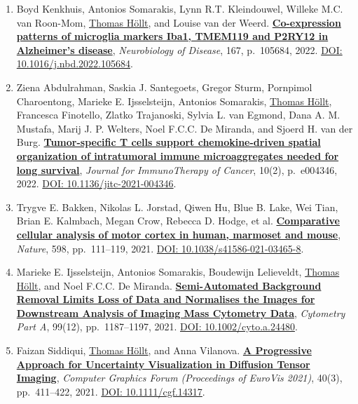\documentclass[10pt,a4paper,roman,final]{moderncv}
\newcommand*\highlightauthor[1]{\underline{#1}}
\begin{document}
\begin{enumerate}[leftmargin=0cm,start=2]
\item
Boyd Kenkhuis, Antonios Somarakis, Lynn R.T. Kleindouwel, Willeke M.C. van Roon-Mom, \highlightauthor{Thomas Höllt}, and Louise van der Weerd.
\href{https://www.thomashollt.com/publications/2022_neurobiology_of_disease/}{\textbf{Co-expression patterns of microglia markers Iba1, TMEM119 and P2RY12 in Alzheimer's disease}},
\emph{Neurobiology of Disease}, 167, p.~105684,
2022.
\href{https://doi.org/10.1016/j.nbd.2022.105684}{DOI: 10.1016/\allowbreak j.nbd.2022.105684}.


\item
Ziena Abdulrahman, Saskia J. Santegoets, Gregor Sturm, Pornpimol Charoentong, Marieke E. Ijsselsteijn, Antonios Somarakis, \highlightauthor{Thomas Höllt}, Francesca Finotello, Zlatko Trajanoski, Sylvia L. van Egmond, Dana A. M. Mustafa, Marij J. P. Welters, Noel F.C.C. De Miranda, and Sjoerd H. van der Burg.
\href{https://www.thomashollt.com/publications/2022_immuno_therapy_cancer/}{\textbf{Tumor-specific T cells support chemokine-driven spatial organization of intratumoral immune microaggregates needed for long survival}},
\emph{Journal for ImmunoTherapy of Cancer}, 10(2), p.~e004346,
2022.
\href{https://doi.org/10.1136/jitc-2021-004346}{DOI: 10.1136/\allowbreak jitc-2021-004346}.


\item
Trygve E. Bakken, Nikolas L. Jorstad, Qiwen Hu, Blue B. Lake, Wei Tian, Brian E. Kalmbach, Megan Crow, Rebecca D. Hodge, et al.
\href{https://www.thomashollt.com/publications/2021_nature/}{\textbf{Comparative cellular analysis of motor cortex in human, marmoset and mouse}},
\emph{Nature}, 598, pp.~111--119,
2021.
\href{https://doi.org/10.1038/s41586-021-03465-8}{DOI: 10.1038/\allowbreak s41586-021-03465-8}.


\item
Marieke E. Ijsselsteijn, Antonios Somarakis, Boudewijn Lelieveldt, \highlightauthor{Thomas Höllt}, and Noel F.C.C. De Miranda.
\href{https://www.thomashollt.com/publications/2020_background_removal/}{\textbf{Semi-Automated Background Removal Limits Loss of Data and Normalises the Images for Downstream Analysis of Imaging Mass Cytometry Data}},
\emph{Cytometry Part A}, 99(12), pp.~1187--1197,
2021.
\href{https://doi.org/10.1002/cyto.a.24480}{DOI: 10.1002/\allowbreak cyto.a.24480}.


\item
Faizan Siddiqui, \highlightauthor{Thomas Höllt}, and Anna Vilanova.
\href{https://www.thomashollt.com/publications/2021_eurovis/}{\textbf{A Progressive Approach for Uncertainty Visualization in Diffusion Tensor Imaging}},
\emph{Computer Graphics Forum (Proceedings of EuroVis 2021)}, 40(3), pp.~411--422,
2021.
\href{https://doi.org/10.1111/cgf.14317}{DOI: 10.1111/\allowbreak cgf.14317}.



\end{enumerate}
\end{document}
